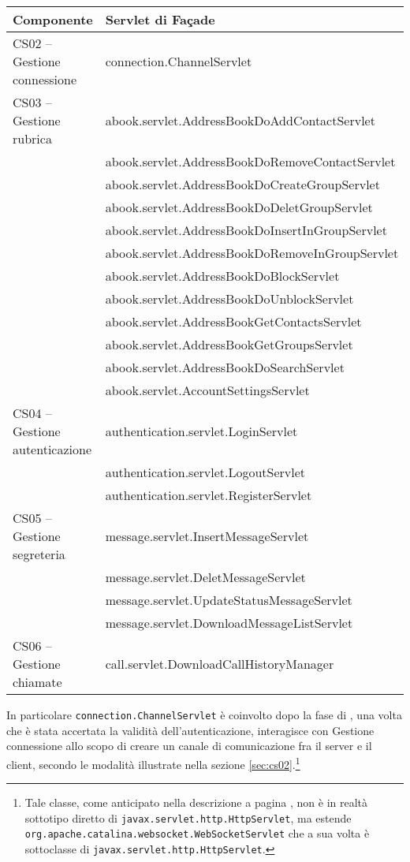 \begin{description}
\begin{center}
\begin{tabular}{>{\sffamily}l>{\ttfamily}p{}}
\toprule
\textbf{\rmfamily Componente} & \textbf{\rmfamily Servlet di Façade}\\
\midrule
CS02 -- Gestione connessione & connection.ChannelServlet\\
CS03 -- Gestione rubrica & abook.servlet.AddressBookDoAddContactServlet\\
& abook.servlet.AddressBookDoRemoveContactServlet\\
& abook.servlet.AddressBookDoCreateGroupServlet\\
& abook.servlet.AddressBookDoDeletGroupServlet\\
& abook.servlet.AddressBookDoInsertInGroupServlet\\
& abook.servlet.AddressBookDoRemoveInGroupServlet\\
& abook.servlet.AddressBookDoBlockServlet\\
& abook.servlet.AddressBookDoUnblockServlet\\
& abook.servlet.AddressBookGetContactsServlet\\
& abook.servlet.AddressBookGetGroupsServlet\\
& abook.servlet.AddressBookDoSearchServlet\\
& abook.servlet.AccountSettingsServlet\\
CS04 -- Gestione autenticazione & authentication.servlet.LoginServlet\\
& authentication.servlet.LogoutServlet\\
& authentication.servlet.RegisterServlet\\
CS05 -- Gestione segreteria & message.servlet.InsertMessageServlet\\
& message.servlet.DeletMessageServlet\\
& message.servlet.UpdateStatusMessageServlet\\
& message.servlet.DownloadMessageListServlet\\
CS06 -- Gestione chiamate & call.servlet.DownloadCallHistoryManager\\
\bottomrule
\end{tabular}
\end{center}

In particolare \texttt{connection.ChannelServlet} è coinvolto dopo la fase di , una volta che è stata accertata la validità dell'autenticazione, interagisce con \textsf{Gestione connessione} allo scopo di creare un canale di comunicazione fra il server e il client, secondo le modalità illustrate nella sezione \ref{sec:cs02}.\footnote{%
Tale classe, come anticipato nella descrizione a pagina \pageref{sec:cs02}, non è in realtà sottotipo diretto di \texttt{javax.servlet.http.HttpServlet}, ma estende \texttt{org.apache.catalina.websocket.WebSocketServlet} che a sua volta è sottoclasse di \texttt{javax.servlet.http.HttpServlet}.
}


\end{description}
